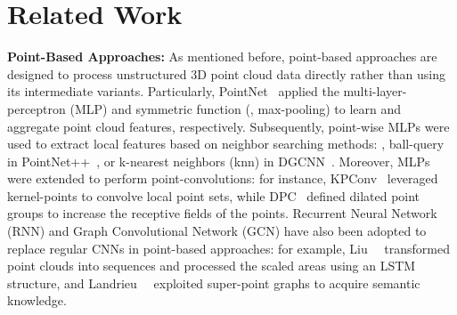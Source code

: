 \documentclass[10pt,twocolumn,letterpaper]{article}
\begin{document}
%
 \section{Related Work}
\label{sec:work}
\noindent \textbf{Point-Based Approaches:}
As mentioned before, point-based approaches are designed to process unstructured 3D point cloud data directly rather than using its intermediate variants. Particularly, PointNet~\cite{qi2017pointnet} applied the multi-layer-perceptron (MLP) and symmetric function (\eg, max-pooling) to learn and aggregate point cloud features, respectively. Subsequently, point-wise MLPs were used to extract local features based on neighbor searching methods: \eg, ball-query in PointNet++~\cite{qi2017pointnet++}, or k-nearest neighbors (knn) in DGCNN~\cite{wang2019dynamic}. Moreover, MLPs were extended to perform point-convolutions: for instance, KPConv~\cite{thomas2019kpconv} leveraged kernel-points to convolve local point sets, while DPC~\cite{engelmann2020dilated} defined dilated point groups to increase the receptive fields of the points. Recurrent Neural Network (RNN) and Graph Convolutional Network (GCN) have also been adopted to replace regular CNNs in point-based approaches: for example, Liu~\etal~\cite{liu2019point2sequence} transformed point clouds into sequences and processed the scaled areas using an LSTM structure, and Landrieu~\etal~\cite{landrieu2018large} exploited super-point graphs to acquire semantic knowledge.
\end{document}
